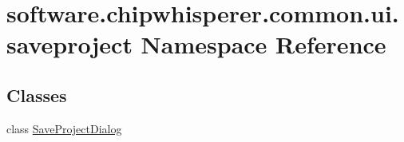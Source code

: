 \hypertarget{namespacesoftware_1_1chipwhisperer_1_1common_1_1ui_1_1saveproject}{}\section{software.\+chipwhisperer.\+common.\+ui.\+saveproject Namespace Reference}
\label{namespacesoftware_1_1chipwhisperer_1_1common_1_1ui_1_1saveproject}
\subsection*{Classes}
\begin{DoxyCompactItemize}
\item 
class \hyperlink{classsoftware_1_1chipwhisperer_1_1common_1_1ui_1_1saveproject_1_1SaveProjectDialog}{Save\+Project\+Dialog}
\end{DoxyCompactItemize}
